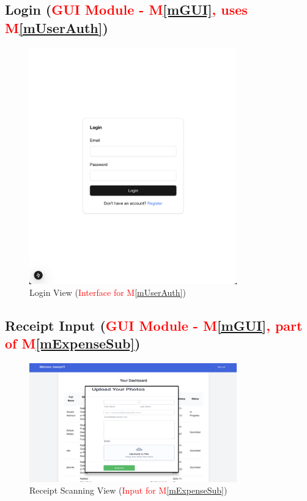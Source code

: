 \documentclass[12pt, titlepage]{article}
\newcommand{\mref}[1]{M\ref{#1}}
\begin{document}
\subsection{Login (\textcolor{red}{GUI Module - \mref{mGUI}, uses \mref{mUserAuth}})}
\begin{figure}[H]
    \centering
    \includegraphics[width=0.8\textwidth]{img/login.png}
    \caption{Login View (\textcolor{red}{Interface for \mref{mUserAuth}})}
    \label{fig:login}
\end{figure}

\subsection{Receipt Input (\textcolor{red}{GUI Module - \mref{mGUI}, part of \mref{mExpenseSub}})}
\begin{figure}[H]
    \centering
    \includegraphics[width=0.8\textwidth]{img/upload.png}
    \caption{Receipt Scanning View (\textcolor{red}{Input for \mref{mExpenseSub}})}
    \label{fig:receipt}
\end{figure}
\end{document}
